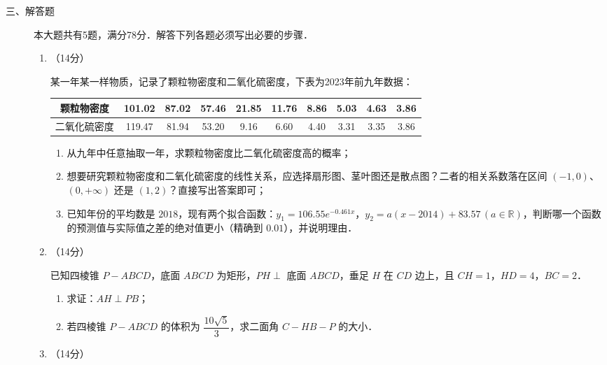 \begin{description}
    \item[三、解答题] 本大题共有5题，满分78分．解答下列各题必须写出必要的步骤．
    \begin{enumerate}[leftmargin=5pt]
      \addtocounter{enumi}{+16}
        \item （14分）

        某一年某一样物质，记录了颗粒物密度和二氧化硫密度，下表为2023年前九年数据：
        \begin{table}[H]
        \centering
        \begin{tabular}{|c|c|c|c|c|c|c|c|c|c|}
        \hline 颗粒物密度 & 101.02 & 87.02 & 57.46 & 21.85 & 11.76 & 8.86 & 5.03 & 4.63 & 3.86 \\
        \hline 二氧化硫密度 & 119.47 & 81.94 & 53.20 & 9.16 & 6.60 & 4.40 & 3.31 & 3.35 & 3.86 \\
        \hline
        \end{tabular}
        \end{table}

        \begin{enumerate}[label=(\arabic*)]
            \item 从九年中任意抽取一年，求颗粒物密度比二氧化硫密度高的概率；
            \item 想要研究颗粒物密度和二氧化硫密度的线性关系，应选择扇形图、茎叶图还是散点图？二者的相关系数落在区间 $(-1,0)$、$(0,+\infty)$ 还是 $(1,2)$？直接写出答案即可；
            \item 已知年份的平均数是 $2018$，现有两个拟合函数：$y_1=106.55e^{-0.461x}$，$y_2=a(x-2014)+83.57\,(a\in\mathbb{R})$，判断哪一个函数的预测值与实际值之差的绝对值更小（精确到 $0.01$），并说明理由．
        \end{enumerate}

        \item （14分）

        已知四棱锥 $P-ABCD$，底面 $ABCD$ 为矩形，$PH\perp$ 底面 $ABCD$，垂足 $H$ 在 $CD$ 边上，且 $CH=1$，$HD=4$，$BC=2$．

        \begin{enumerate}[label=(\arabic*)]
            \item 求证：$AH\perp PB$；
            \item 若四棱锥 $P-ABCD$ 的体积为 $\dfrac{10\sqrt{5}}{3}$，求二面角 $C-HB-P$ 的大小．
        \end{enumerate}

        \item （14分）


\end{enumerate}
\end{description}
